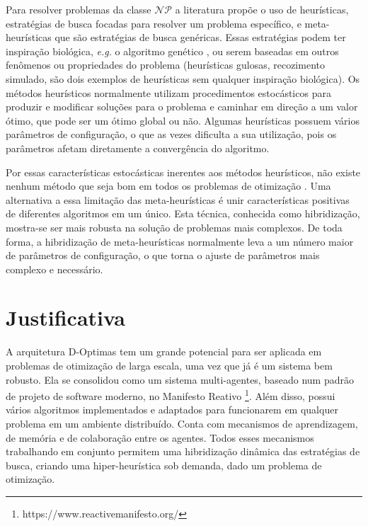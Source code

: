 Para resolver problemas da classe $\mathcal{NP}$ a literatura propõe o uso de heurísticas, estratégias de busca focadas para resolver um problema específico, e meta-heurísticas que são estratégias de busca genéricas. Essas estratégias podem ter inspiração biológica, \textit{e.g.} o algoritmo genético \cite{whitley1994}, ou serem baseadas em outros fenômenos ou propriedades do problema (heurísticas gulosas, recozimento simulado, são dois exemplos de heurísticas sem qualquer inspiração biológica). Os métodos heurísticos normalmente utilizam procedimentos estocásticos para produzir e modificar soluções para o problema e caminhar em direção a um valor ótimo, que pode ser um ótimo global ou não. Algumas heurísticas possuem vários parâmetros de configuração, o que as vezes dificulta a sua utilização, pois os parâmetros afetam diretamente a convergência do algoritmo. 

Por essas características estocásticas inerentes aos métodos heurísticos, não existe nenhum método que seja bom em todos os problemas de otimização \cite[p. 30-32]{eiben2015}. Uma alternativa a essa limitação das meta-heurísticas é unir características positivas de diferentes algoritmos em um único. Esta técnica, conhecida como hibridização,  mostra-se ser mais robusta na solução de problemas mais complexos. De toda forma, a hibridização de meta-heurísticas normalmente leva a um número maior de parâmetros de configuração, o que torna o ajuste de parâmetros mais complexo e necessário.


\section{Justificativa}

A arquitetura D-Optimas tem um grande potencial para ser aplicada em problemas de otimização de larga escala, uma vez que já é um sistema bem robusto. Ela se consolidou como um sistema multi-agentes, baseado num padrão de projeto de software moderno, no Manifesto Reativo \footnote{https://www.reactivemanifesto.org/}. Além disso, possui vários algoritmos implementados e adaptados para funcionarem em qualquer problema em um ambiente distribuído. Conta com mecanismos de aprendizagem, de memória e de colaboração entre os agentes. Todos esses mecanismos trabalhando em conjunto permitem uma hibridização dinâmica das estratégias de busca, criando uma hiper-heurística sob demanda, dado um problema de otimização.

